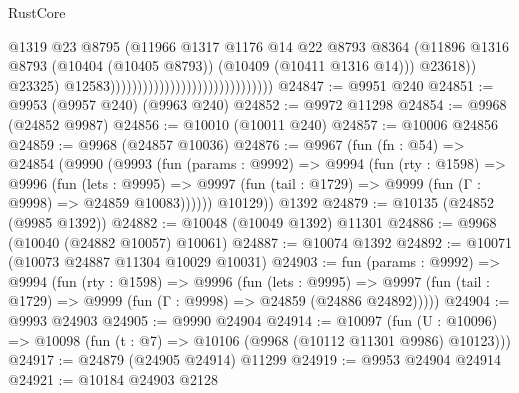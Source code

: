 \begin{lexlean}{RustCore}
\begin{coremodule}
                                                                    @1319
                                                                    @23
                                                                    @8795
                                                                    (@11966
                                                                      @1317
                                                                      @1176
                                                                      @14
                                                                      @22
                                                                      @8793
                                                                      @8364
                                                                      (@11896
                                                                        @1316
                                                                        @8793
                                                                        (@10404 (@10405 @8793))
                                                                        (@10409 (@10411 @1316 @14)))
                                                                      @23618))
                                                                  @23325)
                                                                @12583))))))))))))))))))))))))))))))
@24847 := @9951 @240
@24851 := @9953 (@9957 @240) (@9963 @240)
@24852 := @9972 @11298
@24854 := @9968 (@24852 @9987)
@24856 := @10010 (@10011 @240)
@24857 := @10006 @24856
@24859 := @9968 (@24857 @10036)
@24876 := @9967
    (fun (fn : @54) =>
    @24854
      (@9990
        (@9993
          (fun (params : @9992) =>
          @9994
            (fun (rty : @1598) =>
            @9996
              (fun (lets : @9995) =>
              @9997 (fun (tail : @1729) => @9999 (fun (Γ : @9998) => @24859 @10083))))))
        @10129))
    @1392
@24879 := @10135 (@24852 (@9985 @1392))
@24882 := @10048 (@10049 @1392) @11301
@24886 := @9968 (@10040 (@24882 @10057) @10061)
@24887 := @10074 @1392
@24892 := @10071 (@10073 @24887 @11304 @10029 @10031)
@24903 := fun (params : @9992) =>
  @9994
    (fun (rty : @1598) =>
    @9996
      (fun (lets : @9995) =>
      @9997 (fun (tail : @1729) => @9999 (fun (Γ : @9998) => @24859 (@24886 @24892)))))
@24904 := @9993 @24903
@24905 := @9990 @24904
@24914 := @10097
    (fun (U : @10096) => @10098 (fun (t : @7) => @10106 (@9968 (@10112 @11301 @9986) @10123)))
@24917 := @24879 (@24905 @24914) @11299
@24919 := @9953 @24904 @24914
@24921 := @10184 @24903 @2128

\end{coremodule}
\end{lexlean}
